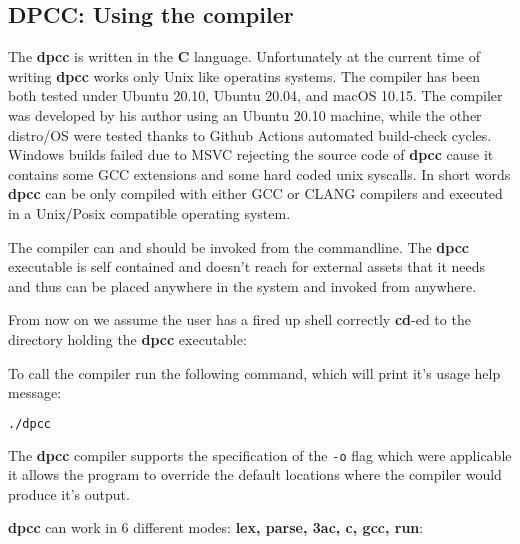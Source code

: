 \documentclass[a4paper]{article}
\begin{document}
\subsection{DPCC: Using the compiler}

The \textbf{dpcc} is written in the \textbf{C} language. Unfortunately at the current time
of writing \textbf{dpcc} works only Unix like operatins systems. The compiler has
been both tested under Ubuntu 20.10, Ubuntu 20.04, and macOS 10.15. The
compiler was developed by his author using an Ubuntu 20.10 machine, while the other distro/OS
were tested thanks to Github Actions automated build-check cycles. Windows builds
failed due to MSVC rejecting the source code of \textbf{dpcc} cause it contains some GCC
extensions and some hard coded unix syscalls.
In short words \textbf{dpcc} can be only compiled with either GCC or CLANG compilers
and executed in a Unix/Posix compatible operating system.


The compiler can and should be invoked from the commandline. The \textbf{dpcc} executable
is self contained and doesn't reach for external assets that it needs and thus can be placed
anywhere in the system and invoked from anywhere.

From now on we assume the user has a fired up shell correctly \textbf{cd}-ed to the directory
holding the \textbf{dpcc} executable:

To call the compiler run the following command, which will print it's usage help message:

\begin{lstlisting}[language=Bash]
./dpcc
\end{lstlisting}

The \textbf{dpcc} compiler supports the specification of the \texttt{-o} flag
which were applicable it allows the program to override the default locations where
the compiler would produce it's output.

\textbf{dpcc} can work in 6 different modes: \textbf{lex, parse, 3ac, c, gcc, run}:
\end{document}
